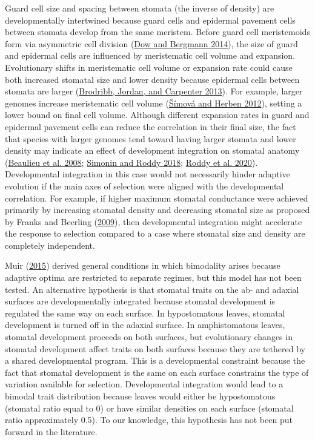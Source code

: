 \documentclass[
  12pt,
]{article}
\begin{document}
Guard cell size and spacing between stomata (the inverse of density) are developmentally intertwined because guard cells and epidermal pavement cells between stomata develop from the same meristem. Before guard cell meristemoids form via asymmetric cell division (\protect\hyperlink{ref-dow_patterning_2014}{Dow and Bergmann 2014}), the size of guard and epidermal cells are influenced by meristematic cell volume and expansion. Evolutionary shifts in meristematic cell volume or expansion rate could cause both increased stomatal size and lower density because epidermal cells between stomata are larger (\protect\hyperlink{ref-brodribb_unified_2013}{Brodribb, Jordan, and Carpenter 2013}). For example, larger genomes increase meristematic cell volume (\protect\hyperlink{ref-simova_geometrical_2012}{Šímová and Herben 2012}), setting a lower bound on final cell volume. Although different expansion rates in guard and epidermal pavement cells can reduce the correlation in their final size, the fact that species with larger genomes tend toward having larger stomata and lower density may indicate an effect of development integration on stomatal anatomy (\protect\hyperlink{ref-beaulieu_genome_2008}{Beaulieu et al. 2008}; \protect\hyperlink{ref-simonin_genome_2018}{Simonin and Roddy 2018}; \protect\hyperlink{ref-roddy_scaling_2020}{Roddy et al. 2020}). Developmental integration in this case would not necessarily hinder adaptive evolution if the main axes of selection were aligned with the developmental correlation. For example, if higher maximum stomatal conductance were achieved primarily by increasing stomatal density and decreasing stomatal size as proposed by Franks and Beerling (\protect\hyperlink{ref-franks_maximum_2009}{2009}), then developmental integration might accelerate the response to selection compared to a case where stomatal size and density are completely independent.

Muir (\protect\hyperlink{ref-muir_making_2015}{2015}) derived general conditions in which bimodality arises because adaptive optima are restricted to separate regimes, but this model has not been tested. An alternative hypothesis is that stomatal traits on the ab- and adaxial surfaces are developmentally integrated because stomatal development is regulated the same way on each surface. In hypostomatous leaves, stomatal development is turned off in the adaxial surface. In amphistomatous leaves, stomatal development proceeds on both surfaces, but evolutionary changes in stomatal development affect traits on both surfaces because they are tethered by a shared developmental program. This is a developmental constraint because the fact that stomatal development is the same on each surface constrains the type of variation available for selection. Developmental integration would lead to a bimodal trait distribution because leaves would either be hypostomatous (stomatal ratio equal to 0) or have similar densities on each surface (stomatal ratio approximately 0.5). To our knowledge, this hypothesis has not been put forward in the literature.
\end{document}
